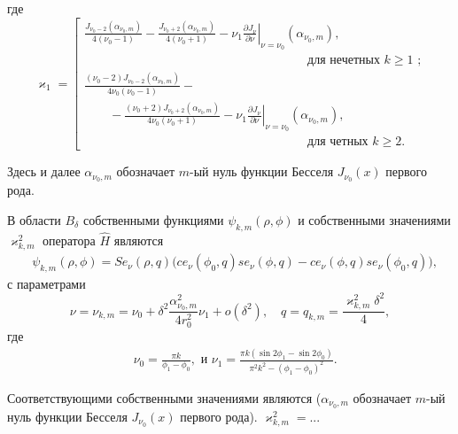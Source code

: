 \begin{frame}
\begin{mytheorem}[A (продолжение)]

где
\begin{equation*}
    \varkappa_1 = 
    \left[
\begin{array}{ll}
\frac{J_{\nu_0-2}(\alpha_{\nu_0, m})}{4(\nu_0-1)} - \frac{J_{\nu_0+2}(\alpha_{\nu_0, m})}{4(\nu_0+1)} 
  - \nu_1 \left.\frac{\partial J_\nu}{\partial \nu}\right|_{\nu=\nu_0}(\alpha_{\nu_0, m}), \\
  \qquad \qquad \qquad \qquad \qquad \qquad \qquad \qquad \qquad  \text{для нечетных $k\geq 1$ ;} \\[10pt]
\frac{(\nu_0 - 2)J_{\nu_0-2}(\alpha_{\nu_0, m})   }{4\nu_0 (\nu_0-1)} -\\
\qquad - \frac{(\nu_0 + 2)J_{\nu_0+2}(\alpha_{\nu_0, m})}{4\nu_0 (\nu_0+1)}  
- \nu_1 \left.\frac{\partial J_\nu}{\partial \nu}\right|_{\nu = \nu_0}(\alpha_{\nu_0, m}), \\
  \qquad \qquad \qquad \qquad \qquad \qquad \qquad \qquad \qquad  \text{для четных $k \geq 2$}.        
\end{array}
\right.
\end{equation*}

Здесь и далее $\alpha_{\nu_0,m}$ обозначает  $m$-ый нуль функции Бесселя  $J_{\nu_0}(x)$ первого рода.


\end{mytheorem}
\end{frame} 
 


\begin{frame}
\begin{mytheorem}[B]\label{th:B}
В области  $B_\delta$ собственными функциями  $\psi_{k, m}(\rho, \phi)$ и собственными значениями  $\varkappa^2_{k, m}$ оператора  $\hat{H}$ являются
\begin{align*}
&\psi_{k, m}(\rho, \phi) = 
    Se_\nu(\rho, q) \bigl( ce_\nu(\phi_0, q) se_\nu(\phi, q) %
    -ce_\nu(\phi, q) se_\nu(\phi_0, q) \bigr) ,  
\end{align*}
с параметрами 
\begin{equation*}    
\nu = \nu_{k,m} = \nu_0 +\delta^2 \frac{\alpha_{\nu_0, m}^2}{4 r_0^2} \nu_1 + o(\delta^2), \quad q=q_{k,m} = \frac{\varkappa_{k,m}^2 \delta^2}{4},
\end{equation*}
где
\begin{align*}
& \nu_0 = \frac{\pi k}{\phi_1-\phi_0},\text{\ \ и \ \ }
\nu_1= \frac{\pi k (\sin 2\phi_1 - \sin 2 \phi_0)}{\pi^2k^2-(\phi_1-\phi_0)^2} .
\end{align*}

Соответствующими собственными значениями являются ($\alpha_{\nu_0,m}$ обозначает $m$-ый нуль функции Бесселя $J_{\nu_0}(x)$ первого рода).
$\varkappa_{k, m}^2 = ...$

\end{mytheorem}

\end{frame}  


